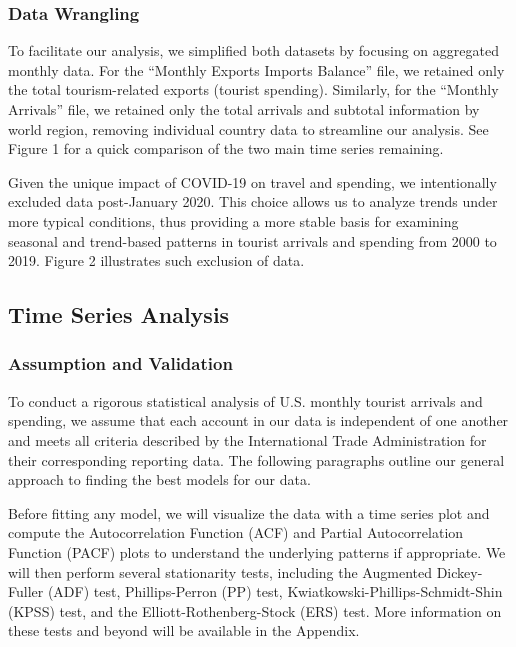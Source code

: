 \documentclass[11pt]{article}
\begin{document}
\subsubsection{Data Wrangling}

To facilitate our analysis, we simplified both datasets by focusing on aggregated monthly data. For the ``Monthly Exports Imports Balance'' file, we retained only the total tourism-related exports (tourist spending). Similarly, for the ``Monthly Arrivals'' file, we retained only the total arrivals and subtotal information by world region, removing individual country data to streamline our analysis. See Figure 1 for a quick comparison of the two main time series remaining.

Given the unique impact of COVID-19 on travel and spending, we intentionally excluded data post-January 2020. This choice allows us to analyze trends under more typical conditions, thus providing a more stable basis for examining seasonal and trend-based patterns in tourist arrivals and spending from 2000 to 2019. Figure 2 illustrates such exclusion of data.

\subsection{Time Series Analysis}

\subsubsection{Assumption and Validation}

To conduct a rigorous statistical analysis of U.S. monthly tourist arrivals and spending, we assume that each account in our data is independent of one another and meets all criteria described by the International Trade Administration for their corresponding reporting data. The following paragraphs outline our general approach to finding the best models for our data.

Before fitting any model, we will visualize the data with a time series plot and compute the Autocorrelation Function (ACF) and Partial Autocorrelation Function (PACF) plots to understand the underlying patterns if appropriate. We will then perform several stationarity tests, including the Augmented Dickey-Fuller (ADF) test, Phillips-Perron (PP) test, Kwiatkowski-Phillips-Schmidt-Shin (KPSS) test, and the Elliott-Rothenberg-Stock (ERS) test. More information on these tests and beyond will be available in the Appendix.
\end{document}
